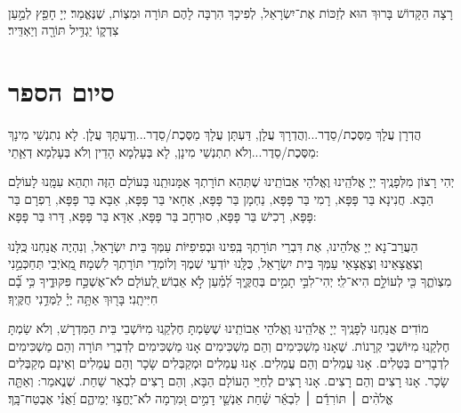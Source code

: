 \documentclass[twoside, openany, parskip=half, 11pt]{book}
\begin{document}
\\
רָצָה הַקָּדוֹשׁ בָּרוּךְ הוּא לְזַכּוֹת אֶת־יִשְׂרָאֵל, לְפִיכָךְ הִרְבָּה לָהֶם תּוֹרָה וּמִצְוֹת, שֶׁנֶּאֱמַר׃
יְיָ חָפֵ֖ץ לְמַ֣עַן צִדְק֑וֹ יַגְדִּ֥יל תּוֹרָ֖ה וְיַאְדִּֽיר׃

\begin{kaddish}

\rabbiskaddish
\end{kaddish}

\chapter[סיום הספר]{ סיום הספר }

הֲדְרָן עֲלָךְ מַסֶּכֶת/סֵדֶר...וְהֲדְרָךְ עֲלָן, דַּעְתָּן עֲלָךְ מַסֶּכֶת/סֵדֶר...וְדַעְתָּךְ עֲלָן. לָא נִתֽנְשֵׁי מִינָךְ מַסֶּכֶת/סֵדֶר...וְלֹא תִתְנְשֵׁי מִינָן, לָא בְּעָלְמָא הָדֵין וְלֹא בְּעָלְמָא דְאַָתֵי:

יְהִי רָצוֹן מִלְּפָנֶֽיךָ יְיָ אֱלֹהֵֽינוּ וֶאֱלֹהֵי אַבוֹתֵֽינוּ שֶׁתְּהֵא תוֹרָתְךָ אֻמָּנוּתֵֽנוּ בָּעוֹלָם הַזֶּה ותְהֵא עִמָּֽנוּ לָעוֹלָם הַבָּא. חֲנִינָא בַּר פָּפָּא, רָמִי בַּר פָּפָּא, נַחְמָן בַּר פָּפָּא, אַחָאי בַּר פָּפָּא, אַבָּא בַּר פָּפָּא, רַפֽרָם בַּר פָּפָּא, רָכִישׁ בַּר פָּפָּא, סוּרְחָב בַּר פָּפָּא, אַדָּא בַּר פָּפָּא, דָּרוּ בַּר פָּפָּא:

הַעֲרֵב־נָא יְיָ אֱלֹהֵינוּ, אֶת דִּבְרֵי תּוֹרָתְךָ בְּֽפִינוּ וּבְפִיפִיּוֹת עַמְּךָ בֵּית יִשְׂרָאֵל, וְנִהְיֶה אֲנַחְנוּ כֻּֽלָּנוּ וְצֶאֱצָאֵינוּ וְצֶאֱצָאֵי עַמְּךָ בֵּית יִשְׂרָאֵל, כֻּלָּֽנוּ יוֹדְעֵי שְׁמֶךָ וְלוֹמְדֵי תּוֹרָתְךָ לִשְׁמָהּ׃%
מֵֽ֭אֹיְבַי תְּחַכְּמֵ֣נִי מִצְוֺתֶ֑ךָ כִּ֖י לְעוֹלָ֣ם הִיא־לִֽי׃ יְהִי־לִבִּ֣י תָמִ֣ים בְּחֻקֶּ֑יךָ לְ֝מַ֗עַן לֹ֣א אֵבֽוֹשׁ׃ לְ֭עוֹלָם לֹא־אֶשְׁכַּ֣ח פִּקּוּדֶ֑יךָ כִּ֥י בָ֗֝ם חִיִּיתָֽנִי׃ בָּר֖וּךְ אַתָּ֥ה יְיָ֗ לַמְּדֵ֥נִי חֻקֶּֽיךָ׃

מוֹדִים אֲנַחְנוּ לְפָנֶֽיךָ יְיָ אֱלֹהֵֽינוּ וֶאֱלֹהֵי אַבוֹתֵֽינוּ שֶׁשַּׂמְתָּ חֶלְקֵֽנוּ מִיּוֹשְׁבֵי בֵּית הַמִּדְרָשׁ, וְלֹא שַׂמְתָּ חֶלְקֵֽנוּ מִיּוֹשְׁבֵי קְרָנוֹת. שֶׁאָנוּ מַשְׁכִּימִים וְהֵם מַשְׁכִּימִים אָנוּ מַשְׁכִּימִים לְדִבְרֵי תּוֹרָה וְהֵם מַשְׁכִּימִים לִדְבָרִים בְּטֵלִים. אָנוּ עֲמֵלִים וְהֵם עֲמֵלִים. אָנוּ עֲמֵלִים וּמְקַבְּלִים שָׂכָר וְהֵם עֲמֵלִים וְאֵינָם מְקַבְּלִים שָׂכָר. אָנוּ רָצִים וְהֵם רָצִים. אָנוּ רָצִים לְחַיֵּי הָעוֹלָם הַבָּא, וְהֵם רָצִים לִבְאֵר שַׁחַת. שֶׁנֱאמַר:
וְאַתָּ֤ה אֱלֹהִ֨ים ׀ תּוֹרִדֵ֬ם ׀ לִבְאֵ֬ר שַׁ֗חַת אַנְשֵׁ֤י דָמִ֣ים וּ֭מִרְמָה לֹא־יֶחֱצ֣וּ יְמֵיהֶ֑ם וַ֝אֲנִ֗י אֶבְטַח־בָּֽךְ׃
\end{document}
